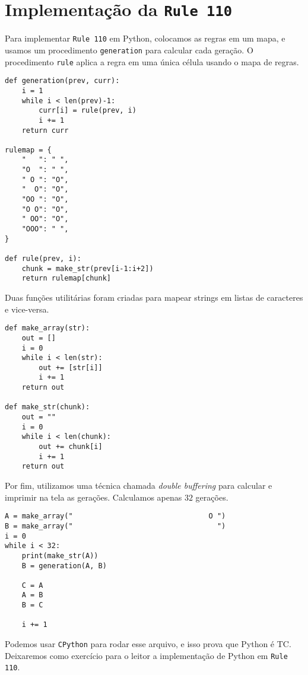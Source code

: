 \section{Implementação da \texttt{Rule 110}}

Para implementar \texttt{Rule 110} em Python,
colocamos as regras em um mapa, e usamos um procedimento
\verb|generation| para calcular cada geração. O procedimento
\verb|rule| aplica a regra em uma única célula usando
o mapa de regras.

\begin{lstlisting}
def generation(prev, curr):
    i = 1
    while i < len(prev)-1:
        curr[i] = rule(prev, i)
        i += 1
    return curr

rulemap = {
    "   ": " ",
    "O  ": " ",
    " O ": "O",
    "  O": "O",
    "OO ": "O",
    "O O": "O",
    " OO": "O",
    "OOO": " ",
}

def rule(prev, i):
    chunk = make_str(prev[i-1:i+2])
    return rulemap[chunk]
\end{lstlisting}

Duas funções utilitárias foram criadas para
mapear strings em listas de caracteres e vice-versa.

\begin{lstlisting}
def make_array(str):
    out = []
    i = 0
    while i < len(str):
        out += [str[i]]
        i += 1
    return out

def make_str(chunk):
    out = ""
    i = 0
    while i < len(chunk):
        out += chunk[i]
        i += 1
    return out

\end{lstlisting}
\clearpage
{}
Por fim, utilizamos uma técnica chamada
\textit{double buffering} para calcular e imprimir na tela as
gerações. Calculamos apenas \(32\) gerações.

\begin{lstlisting}
A = make_array("                                O ")
B = make_array("                                  ")
i = 0
while i < 32:
    print(make_str(A))
    B = generation(A, B)

    C = A
    A = B
    B = C

    i += 1
\end{lstlisting}

Podemos usar \texttt{CPython} para rodar esse arquivo,
e isso prova que Python é TC. Deixaremos como exercício
para o leitor a implementação de Python em \texttt{Rule 110}.
